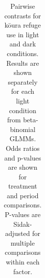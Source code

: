 \documentclass[
  12pt,
  a4paper,
  oneside]{scrbook}
\begin{document}
{

\begin{longtable}[]{@{}
  >{\raggedright\arraybackslash}p{}
  >{\raggedright\arraybackslash}p{}
  >{\raggedleft\arraybackslash}p{}
  >{\raggedleft\arraybackslash}p{}
  >{\raggedleft\arraybackslash}p{}
  >{\raggedleft\arraybackslash}p{}
  >{\raggedleft\arraybackslash}p{}
  >{\raggedleft\arraybackslash}p{}@{}}

\caption{\label{tbl-emmeans-stratified}Pairwise contrasts for kōura
refuge use in light and dark conditions. Results are shown separately
for each light condition from beta-binomial GLMMs. Odds ratios and
p-values are shown for treatment and period comparisons. P-values are
Sidak-adjusted for multiple comparisons within each factor.}

\tabularnewline


\end{longtable}}
\end{document}
